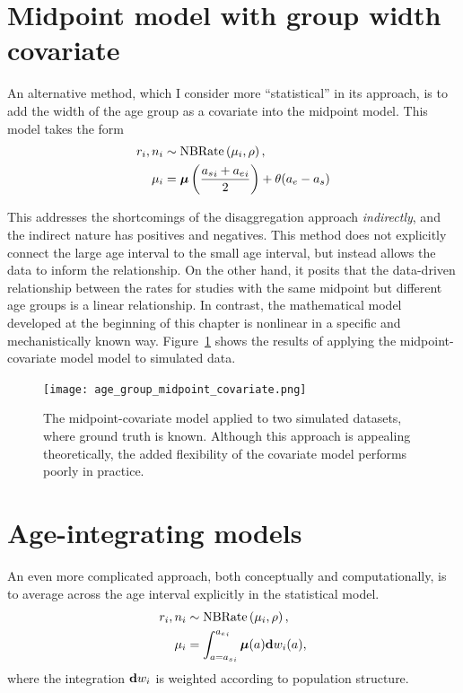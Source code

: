 \section{Midpoint model with group width covariate}
An alternative method, which I consider more ``statistical'' in its
approach, is to add the width of the age group as a covariate into the
midpoint model.  This model takes the form
\begin{align*}
r_i, n_i &\sim \operatorname{NBRate}\left(\mu_i, \rho\right),\\
\mu_i &= \boldsymbol{\mu}\left(\frac{{a_s}_i+{a_e}_i}{2}\right) + \theta (a_e - a_s)
\end{align*}

This addresses the shortcomings of the disaggregation approach
\emph{indirectly}, and the indirect nature has positives and
negatives.  This method does not explicitly connect the large age
interval to the small age interval, but instead allows the data to
inform the relationship.  On the other hand, it posits that the
data-driven relationship between the rates for studies with the same
midpoint but different age groups is a linear relationship. In
contrast, the mathematical model developed at the beginning of this
chapter is nonlinear in
a specific and mechanistically known way.
Figure~\ref{midpoint-covariate} shows the results of applying the midpoint-covariate model
model to simulated data.


\begin{figure}[h]
\begin{center}
\texttt{[image: age\_group\_midpoint\_covariate.png]}
\caption{The midpoint-covariate model applied to two simulated
  datasets, where ground truth is known. Although this approach is
  appealing theoretically, the added flexibility of the covariate
  model performs poorly in practice. }
\label{midpoint-covariate}
\end{center}
\end{figure}

\section{Age-integrating models}
An even more complicated approach, both conceptually and
computationally, is to average across the age interval explicitly in
the statistical model.
\begin{align*}
r_i, n_i &\sim \operatorname{NBRate}\left(\mu_i, \rho\right),\\
\mu_i &= \int_{a={a_s}_i}^{{a_e}_i} \boldsymbol{\mu}(a)\mathbf{d} w_i(a),
\end{align*}
where the integration $\mathbf{d} w_i$ is weighted according to population
structure.

